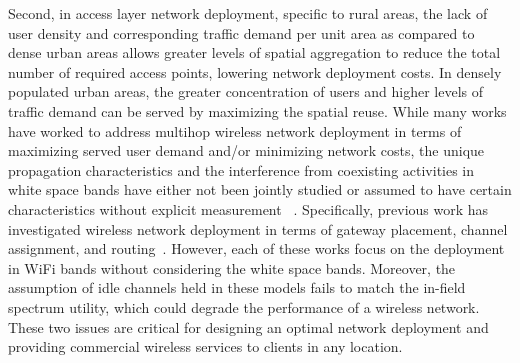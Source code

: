 Second, in access layer network deployment, specific to rural areas, 
the lack of user density and corresponding traffic demand per unit area 
as compared to dense urban areas allows greater levels of spatial 
aggregation to reduce the total number of required access points, 
lowering network deployment costs. In densely populated urban areas, 
the greater concentration of users and higher levels of traffic demand 
can be served by maximizing the spatial reuse. While many works have 
worked to address multihop wireless network deployment in terms of 
maximizing served user demand and/or minimizing network costs, the 
unique propagation characteristics and the interference from coexisting
activities in white space bands have either not been jointly studied 
or assumed to have certain characteristics without explicit measurement
~\cite{si2010overview}. Specifically, previous work has investigated 
wireless network deployment in terms of gateway placement, channel 
assignment, and routing~\cite{he2008optimizing,marina2010topology}.
However, each of these works focus on the deployment in WiFi bands 
without considering the white space bands. Moreover, the assumption 
of idle channels held in these models fails to match the in-field 
spectrum utility, which could degrade the performance of a wireless 
network. These two issues are critical for designing an optimal 
network deployment and providing commercial wireless services to 
clients in any location.




